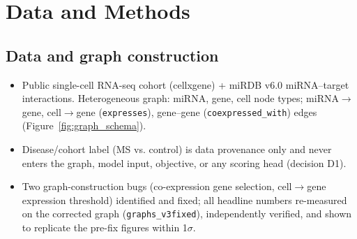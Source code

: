 \documentclass{bmcart}
\begin{document}


\section*{Data and Methods}

\subsection*{Data and graph construction}
\begin{itemize}
\item [STAGE] Public single-cell RNA-seq cohort (cellxgene) + miRDB v6.0 miRNA--target
interactions. Heterogeneous graph: miRNA, gene, cell node types; miRNA$\to$gene,
cell$\to$gene (\texttt{expresses}), gene--gene (\texttt{coexpressed\_with}) edges
(Figure~\ref{fig:graph_schema}).
\item [STAGE] Disease/cohort label (MS vs. control) is data provenance only and never
enters the graph, model input, objective, or any scoring head (decision D1).
\item [STAGE] Two graph-construction bugs (co-expression gene selection, cell$\to$gene
expression threshold) identified and fixed; all headline numbers re-measured on the
corrected graph (\texttt{graphs\_v3fixed}), independently verified, and shown to
replicate the pre-fix figures within 1$\sigma$.
\end{itemize}
\end{document}
